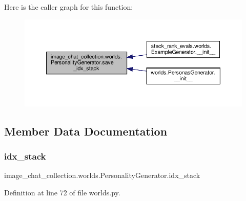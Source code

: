 Here is the caller graph for this function\+:
\nopagebreak
\begin{figure}[H]
\begin{center}
\leavevmode
\includegraphics[width=350pt]{classimage__chat__collection_1_1worlds_1_1PersonalityGenerator_a19645254b8da82832d6bcb0825119c65_icgraph}
\end{center}
\end{figure}


\subsection{Member Data Documentation}
\mbox{\label{classimage__chat__collection_1_1worlds_1_1PersonalityGenerator_acbfcdffd779cc5be94fb47154c770c8a}} 
\subsubsection{\texorpdfstring{idx\+\_\+stack}{idx\_stack}}
{\footnotesize\ttfamily image\+\_\+chat\+\_\+collection.\+worlds.\+Personality\+Generator.\+idx\+\_\+stack}



Definition at line 72 of file worlds.\+py.



